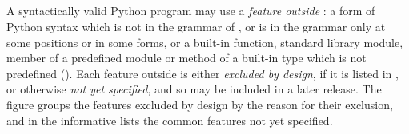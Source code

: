 \subsection{}
\label{sec:excluded-by-design}

\begin{AddedBlock}
A syntactically valid Python program may use a \emph{feature outside \PurePy}: a form of Python syntax which is not
in the grammar of , or is in the grammar only at some positions or in some forms, or a built-in
function, standard library module, member of a predefined module or method of a built-in type which is not predefined
(). Each feature outside \PurePy is either \emph{excluded by design}, if it is listed in
, or otherwise \emph{not yet specified}, and so may be included in a later release. The
figure groups the features excluded by design by the reason for their exclusion, and  in
the informative  lists the common features not yet specified.
\end{AddedBlock}


